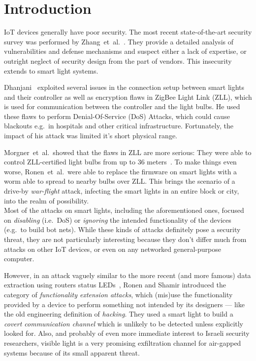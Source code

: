 \section{Introduction} %
\label{sec:intorduction}


IoT devices generally have poor security. The most recent state-of-the-art security survey was performed by Zhang~et~al.~\cite{Zhang:2017:UISTDCBWWNaWWG}. They provide a detailed analysis of vulnerabilities and defense mechanisms and suspect either a lack of expertise, or outright neglect of security design from the part of vendors.
This insecurity extends to smart light systems.

Dhanjani~\cite{Dhanjani:2013:HLSEPHPWLS} exploited several issues in the connection setup between smart lights and their controller as well as encryption flaws in ZigBee Light Link (ZLL), which is used for communication between the controller and the light bulbs.
He used these flaws to perform Denial-Of-Service (DoS) Attacks, which could cause blackouts e.g.\ in hospitals and other critical infrastructure.
Fortunately, the impact of his attack was limited it's short physical range.

Morgner~et~al.\ showed that the flaws in ZLL are more serious: They were able to control ZLL-certified light bulbs from up to 36 meters~\cite{Morgner:2016:AYBBUICSSCLS}.
To make things even worse, Ronen~et~al.\ were able to replace the firmware on smart lights with a worm able to spread to nearby bulbs over ZLL.
This brings the scenario of a drive-by \emph{war-flight} attack, infecting the smart lights in an entire block or city, into the realm of possibility.\\

Most of the attacks on smart lights, including the aforementioned ones, focused on \emph{disabling} (i.e.\ DoS) or \emph{ignoring} the intended functionality of the devices (e.g.\ to build bot nets).
While these kinds of attacks definitely pose a security threat, they are not particularly interesting because they don't differ much from attacks on other IoT devices, or even on any networked general-purpose computer.

However, in an attack vaguely similar to the more recent (and more famous) data extraction using routers status LEDs~\cite{Guri:2017:xCDEANvRL}, Ronen and Shamir introduced the category of \emph{functionality extension attacks}, which (mis)use the functionality provided by a device to perform something not intended by its designers --- like the old engineering definition of \emph{hacking}.
They used a smart light to build a \emph{covert communication channel} which is unlikely to be detected unless explicitly looked for.
Also, and probably of even more immediate interest to Israeli security researchers, visible light is a very promising exfiltration channel for air-gapped systems because of its small apparent threat.

